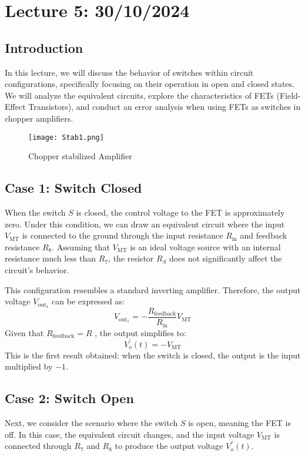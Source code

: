 \documentclass[a4paper,9pt,twoside,openany,twocolumn]{memoir}
\begin{document}
\section*{Lecture 5: 30/10/2024}

\subsection{Introduction}
In this lecture, we will discuss the behavior of switches within circuit configurations, specifically focusing on their operation in open and closed states. We will analyze the equivalent circuits, explore the characteristics of FETs (Field-Effect Transistors), and conduct an error analysis when using FETs as switches in chopper amplifiers.
\begin{figure}[h]
    \centering
    \texttt{[image: Stab1.png]}
    \caption{Chopper stabilized Amplifier}
\end{figure}
\subsection{Case 1: Switch Closed}
When the switch \( S \) is closed, the control voltage to the FET is approximately zero. Under this condition, we can draw an equivalent circuit where the input \( V_{\text{MT}} \) is connected to the ground through the input resistance \( R_{\text{in}} \) and feedback resistance \( R_8 \). Assuming that \( V_{\text{MT}} \) is an ideal voltage source with an internal resistance much less than \( R_7 \), the resistor \( R_S \) does not significantly affect the circuit's behavior.

This configuration resembles a standard inverting amplifier. Therefore, the output voltage \( V_{\text{out}_1} \) can be expressed as:
\[
V_{\text{out}_1} = -\frac{R_{\text{feedback}}}{R_{\text{in}}} V_{\text{MT}}
\]
Given that \( R_{\text{feedback}} = R \) , the output simplifies to:
\[
V_o^{'}(t) = -V_{\text{MT}}
\]
This is the first result obtained: when the switch is closed, the output is the input multiplied by \(-1\).

\subsection{Case 2: Switch Open}
Next, we consider the scenario where the switch \( S \) is open, meaning the FET is off. In this case, the equivalent circuit changes, and the input voltage \( V_{\text{MT}} \) is connected through \( R_7 \) and \( R_8 \) to produce the output voltage \( V_o^{''}(t) \).
\end{document}
